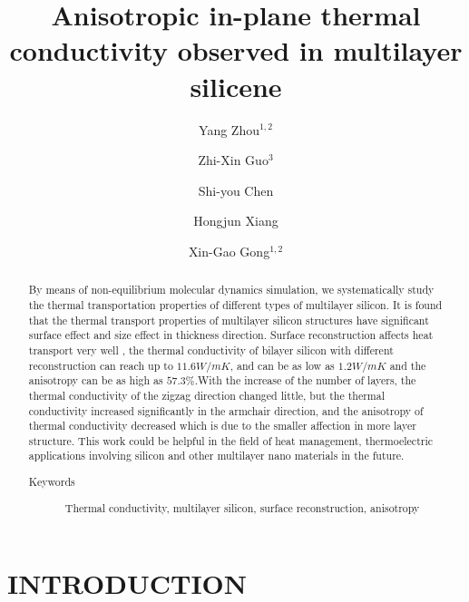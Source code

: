 \documentclass[%
 reprint,
 amsmath,amssymb,
 aps,
 prb,
]{revtex4-1}
\begin{document}
\title{Anisotropic in-plane thermal conductivity observed in multilayer silicene}
\author{Yang Zhou${}^{1,2}$}
\author{Zhi-Xin Guo${}^{3}$}
\author{Shi-you Chen}
\author{Hongjun Xiang}
\author{Xin-Gao Gong${}^{1,2}$}
\begin{abstract}
By means of non-equilibrium molecular dynamics simulation, we systematically study the thermal transportation properties of different types of multilayer silicon. It is found that the thermal transport properties of multilayer silicon structures have significant surface effect and size effect in thickness direction. Surface reconstruction affects heat transport very well , the thermal conductivity of bilayer silicon with different reconstruction can reach up to $11.6 W/mK$, and can be as low as $1.2 W/mK$ and the anisotropy can be as high as $57.3\%$.With the increase of the number of layers, the thermal conductivity of the zigzag direction changed little, but the thermal conductivity increased significantly in the armchair direction, and the anisotropy of thermal conductivity decreased which is due to the smaller affection in more layer structure. This work could be helpful in the field of heat management, thermoelectric applications involving silicon and other multilayer nano materials in the future.
\begin{description}
\item[Keywords]
Thermal conductivity, multilayer silicon, surface reconstruction, anisotropy
\end{description}
\end{abstract}

\maketitle

\section{INTRODUCTION}
\end{document}
